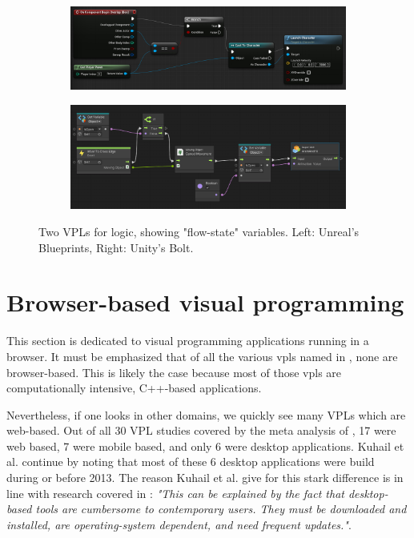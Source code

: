 \begin{figure}
\centering
\begin{subfigure}[b]{0.45\linewidth}
  \graphicspath{{../../assets/images/background/geo-vpl/}}
  \centering
  \includegraphics[width=\linewidth]{unreal-blueprints.jpg}
  \caption{}\label{fig:logic-vpl:1}
\end{subfigure}%
\qquad %
\begin{subfigure}[b]{0.45\linewidth}
  \graphicspath{{../../assets/images/background/geo-vpl/}}
  \centering
  \includegraphics[width=\linewidth]{unity-bolt-2.png}
  \caption{}\label{fig:logic-vpl:2}
\end{subfigure}%
\caption[Behavioral VPLs]{Two VPLs for logic, showing "flow-state" variables. Left: Unreal's Blueprints, Right: Unity's Bolt. \citep{epic_games_blueprints_2022, unity_technologies_bolt_2021}}
\label{fig:logic-vpl}
\end{figure}

\section{Browser-based visual programming}
\label{sec:related-webvpl}

This section is dedicated to visual programming applications running in a browser.
It must be emphasized that of all the various vpls named in , none are browser-based. 
This is likely the case because most of those vpls are computationally intensive, C++-based applications.

Nevertheless, if one looks in other domains, we quickly see many \ac{VPL}s which are web-based. 
Out of all 30 VPL studies covered by the meta analysis of \cite{kuhail_characterizing_2021}, 17 were web based, 7 were mobile based, and only 6 were desktop applications. 
Kuhail et al. continue by noting that most of these 6 desktop applications were build during or before 2013. 
The reason Kuhail et al. give for this stark difference is in line with research covered in : 
\emph{"This can be explained by the fact that desktop-based tools are cumbersome to contemporary users. They must be downloaded and installed, are operating-system dependent, and need frequent updates."}.

